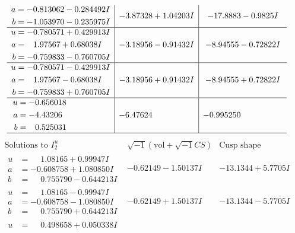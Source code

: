 \documentclass[1p]{elsarticle_modified}
\theoremstyle{definition}
\newcommand{\I}{\sqrt{-1}}
\begin{document}
$$\begin{array}{c|c|c}
\begin{aligned}
a &= -0.813062 - 0.284492 I \\
b &= -1.053970 - 0.235975 I\end{aligned}
 & -3.87328 + 1.04203 I & -17.8883 - 0.9825 I \\ \hline\begin{aligned}
u &= -0.780571 + 0.429913 I \\
a &= \phantom{-}1.97567 + 0.68038 I \\
b &= -0.759833 - 0.760705 I\end{aligned}
 & -3.18956 - 0.91432 I & -8.94555 - 0.72822 I \\ \hline\begin{aligned}
u &= -0.780571 - 0.429913 I \\
a &= \phantom{-}1.97567 - 0.68038 I \\
b &= -0.759833 + 0.760705 I\end{aligned}
 & -3.18956 + 0.91432 I & -8.94555 + 0.72822 I \\ \hline\begin{aligned}
u &= -0.656018\phantom{ +0.000000I} \\
a &= -4.43206\phantom{ +0.000000I} \\
b &= \phantom{-}0.525031\phantom{ +0.000000I}\end{aligned}
 & -6.47624\phantom{ +0.000000I} & -0.995250\phantom{ +0.000000I}\\
 \hline 
 \end{array}$$\newpage$$\begin{array}{c|c|c}  
\text{Solutions to }I^u_{2}& \I (\text{vol} + \sqrt{-1}CS) & \text{Cusp shape}\\
 \hline 
\begin{aligned}
u &= \phantom{-}1.08165 + 0.99947 I \\
a &= -0.608758 + 1.080850 I \\
b &= \phantom{-}0.755790 - 0.644213 I\end{aligned}
 & -0.62149 - 1.50137 I & -13.1344 + 5.7705 I \\ \hline\begin{aligned}
u &= \phantom{-}1.08165 - 0.99947 I \\
a &= -0.608758 - 1.080850 I \\
b &= \phantom{-}0.755790 + 0.644213 I\end{aligned}
 & -0.62149 + 1.50137 I & -13.1344 - 5.7705 I \\ \hline\begin{aligned}
u &= \phantom{-}0.498658 + 0.050338 I \\

\end{aligned}
\end{array}$$
\end{document}
